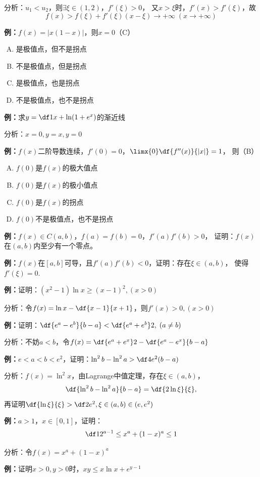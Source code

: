 分析：$u_1<u_2$，则$\exists\xi\in(1,2)$，$f'(\xi)>0$，
又$x>\xi$时，$f'(x)>f'(\xi)$，故
$$f(x)>f(\xi)+f'(\xi)(x-\xi)\to+\infty\;(x\to+\infty)$$

{\bf 例：}$f(x)=|x(1-x)|$，则$x=0$（C）
\begin{enumerate}[A)]
  \setlength{\itemindent}{1cm}
  \item 是极值点，但不是拐点
  \item 不是极值点，但是拐点
  \item 是极值点，也是拐点
  \item 不是极值点，也不是拐点
\end{enumerate}

{\bf 例：}求$y=\df1x+\ln(1+e^x)$的渐近线

分析：$x=0,y=x,y=0$

{\bf 例：}$f(x)$二阶导数连续，$f'(0)=0$，$\limx{0}\df{f''(x)}{|x|}=1$，
则（B）
\begin{enumerate}[A)]
  \setlength{\itemindent}{1cm}
  \item $f(0)$是$f(x)$的极大值点
  \item $f(0)$是$f(x)$的极小值点
  \item $f(0)$是$f(x)$的拐点
  \item $f(0)$不是极值点，也不是拐点
\end{enumerate}

{\bf 例：}$f(x)\in C(a,b)$，$f(a)=f(b)=0$，$f'(a)f'(b)>0$，
证明：$f(x)$在$(a,b)$内至少有一个零点。

{\bf 例：}$f(x)$在$[a,b]$可导，且$f'(a)f'(b)<0$，证明：存在$\xi\in(a,b)$，
使得$f'(\xi)=0$.

{\bf 例：}证明：$(x^2-1)\ln x\geq(x-1)^2,(x>0)$

分析：令$f(x)=\ln x-\df{x-1}{x+1}$，则$f'(x)>0,(x>0)$

{\bf 例：}证明：$\df{e^a-e^b}{b-a}<\df{e^a+e^b}2,\;(a\ne b)$

分析：不妨$a<b$，令$f(x)=\df{e^a+e^x}2-\df{e^a-e^x}{b-a}$

{\bf 例：}$e<a<b<e^2$，证明：$\ln^2b-\ln^2a>\df4{e^2}(b-a)$

分析：$f(x)=\ln^2x$，由Lagrange中值定理，存在$\xi\in(a,b)$，
$$\df{\ln^2b-\ln^2a}{b-a}=\df{2\ln\xi}{\xi},$$
再证明$\df{\ln\xi}{\xi}>\df2{e^2},\xi\in(a,b)\in(e,e^2)$

{\bf 例：}$a>1$，$x\in[0,1]$，证明：
$$\df1{2^{a-1}}\leq x^a+(1-x)^a\leq 1$$

分析：令$f(x)=x^a+(1-x)^a$

{\bf 例：}证明$x>0,y>0$时，$xy\leq x\ln x+e^{y-1}$

